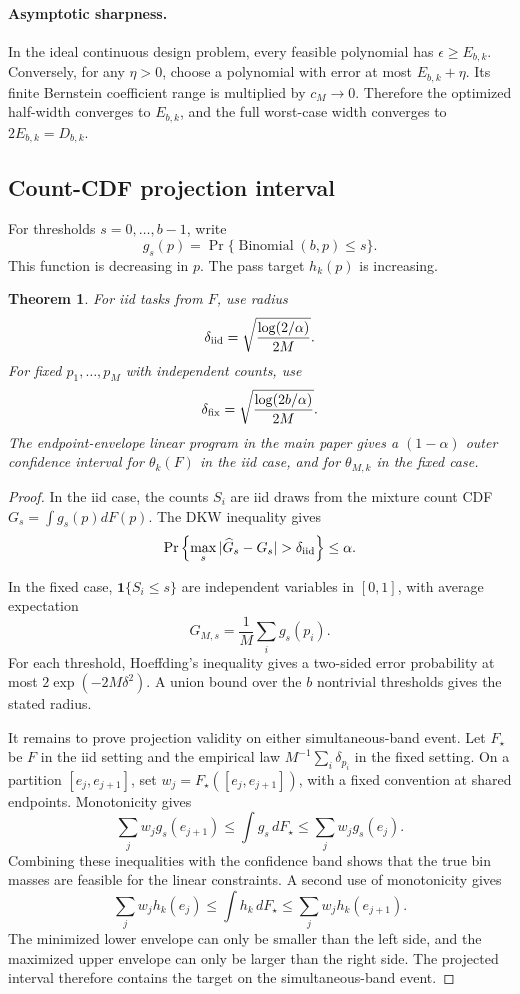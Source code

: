 \documentclass[twoside]{article}
\newtheorem{theorem}{Theorem}
\begin{document}
\paragraph{Asymptotic sharpness.}
In the ideal continuous design problem, every feasible polynomial has
\(\epsilon\geq E_{b,k}\). Conversely, for any \(\eta>0\), choose a polynomial
with error at most \(E_{b,k}+\eta\). Its finite Bernstein coefficient range is
multiplied by \(c_M\to0\). Therefore the optimized half-width converges to
\(E_{b,k}\), and the full worst-case width converges to
\(2E_{b,k}=D_{b,k}\).

\subsection{Count-CDF projection interval}

For thresholds \(s=0,\ldots,b-1\), write
\[
 g_s(p)=\Pr\{\operatorname{Binomial}(b,p)\leq s\}.
\]
This function is decreasing in \(p\). The pass target \(h_k(p)\) is
increasing.

\begin{theorem}
For iid tasks from \(F\), use radius
\[
 \delta_{\rm iid}=\sqrt{\frac{\log(2/\alpha)}{2M}}.
\]
For fixed \(p_1,\ldots,p_M\) with independent counts, use
\[
 \delta_{\rm fix}=\sqrt{\frac{\log(2b/\alpha)}{2M}}.
\]
The endpoint-envelope linear program in the main paper gives a
\((1-\alpha)\) outer confidence interval for \(\theta_k(F)\) in the iid case,
and for \(\theta_{M,k}\) in the fixed case.
\end{theorem}

\begin{proof}
In the iid case, the counts \(S_i\) are iid draws from the mixture count CDF
\(G_s=\int g_s(p)dF(p)\). The DKW inequality
\citep{massart1990} gives
\[
 \Pr\left\{\max_s|\widehat G_s-G_s|>\delta_{\rm iid}\right\}
\leq\alpha.
\]

In the fixed case,
\(\mathbf1\{S_i\leq s\}\) are independent variables in \([0,1]\), with
average expectation
\[
 G_{M,s}=\frac1M\sum_i g_s(p_i).
\]
For each threshold, Hoeffding's inequality gives a two-sided error probability
at most \(2\exp(-2M\delta^2)\). A union bound over the \(b\) nontrivial
thresholds gives the stated radius.

It remains to prove projection validity on either simultaneous-band event.
Let \(F_\star\) be \(F\) in the iid setting and the empirical law
\(M^{-1}\sum_i\delta_{p_i}\) in the fixed setting. On a partition
\([e_j,e_{j+1}]\), set \(w_j=F_\star([e_j,e_{j+1}])\), with a fixed convention
at shared endpoints. Monotonicity gives
\[
 \sum_jw_jg_s(e_{j+1})
 \leq\int g_s\,dF_\star
 \leq\sum_jw_jg_s(e_j).
\]
Combining these inequalities with the confidence band shows that the true
bin masses are feasible for the linear constraints. A second use of
monotonicity gives
\[
 \sum_jw_jh_k(e_j)
 \leq\int h_k\,dF_\star
 \leq\sum_jw_jh_k(e_{j+1}).
\]
The minimized lower envelope can only be smaller than the left side, and the
maximized upper envelope can only be larger than the right side. The projected
interval therefore contains the target on the simultaneous-band event.
\end{proof}
\end{document}
